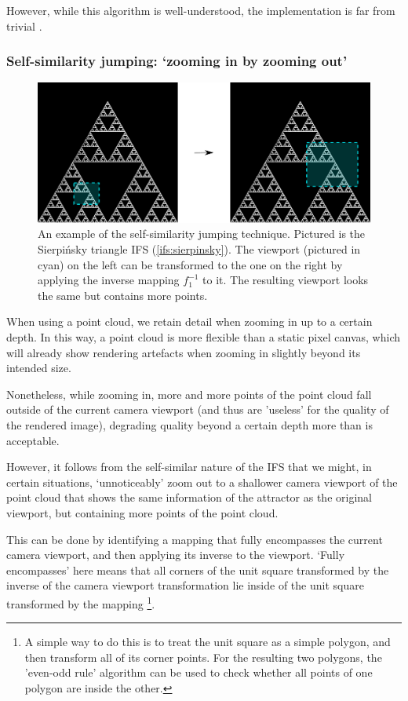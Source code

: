 \documentclass[11pt]{article}
\begin{document}
However, while this algorithm is well-understood, the implementation is far from trivial \cite{lauterbach2009construction}.

\subsubsection{Self-similarity jumping: `zooming in by zooming out'}
\label{sec:orge5954d6}
\label{subsection:self_similarity}

\begin{figure}

\includegraphics[width=\textwidth]{figures/sierpinsky_jump}
\caption{An example of the self-similarity jumping technique. Pictured is the Sierpi\'nsky triangle IFS (\autoref{ifs:sierpinsky}).
The viewport (pictured in cyan) on the left can be transformed to the one on the right by applying the inverse mapping $f_1^{-1}$ to it.
The resulting viewport looks the same but contains more points.}
\label{figure:sierpinsky_jump}
\end{figure}

When using a point cloud, we retain detail when zooming in up to a certain depth. In this way, a point cloud is more flexible than a 
static pixel canvas, which will already show rendering artefacts when zooming in slightly beyond its intended size.

Nonetheless, while zooming in, more and more points of the point cloud fall outside of the current camera viewport
(and thus are 'useless' for the quality of the rendered image), degrading quality beyond a certain depth more than is acceptable.

However, it follows from the self-similar nature of the IFS that we might, in certain situations,
`unnoticeably' zoom out to a shallower camera viewport of the point cloud that shows the same information of the attractor
as the original viewport, but containing more points of the point cloud.

This can be done by identifying a mapping that fully encompasses the current camera viewport, and then applying its inverse
to the viewport.
`Fully encompasses' here means that 
all corners of the unit square transformed by the inverse of the camera viewport transformation
lie inside of the unit square transformed by the mapping \footnote{A simple way to do this is to treat the unit square as a simple polygon,
and then transform all of its corner points. For the resulting two polygons, the 'even-odd rule' algorithm
\cite{haines1994point}
can be used to check whether all points of one polygon are inside the other.}.
\end{document}
